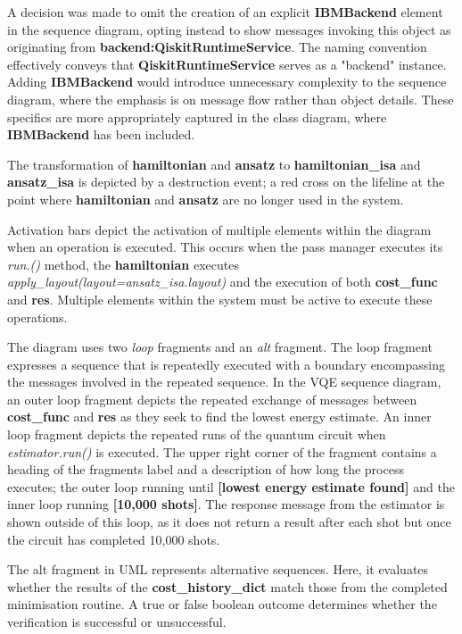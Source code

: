 \documentclass{article}
\begin{document}
A decision was made to omit the creation of an explicit \textbf{IBMBackend} element in the sequence diagram, opting instead to show messages invoking this object as originating from \textbf{backend:QiskitRuntimeService}.
The naming convention effectively conveys that \textbf{QiskitRuntimeService} serves as a "backend" instance. Adding \textbf{IBMBackend} would introduce unnecessary complexity to the sequence diagram, where the emphasis is on message flow rather than object details. These specifics are more appropriately captured in the class diagram, where \textbf{IBMBackend} has been included.

The transformation of \textbf{hamiltonian} and \textbf{ansatz} to \textbf{hamiltonian\_isa} and \textbf{ansatz\_isa} is depicted by a destruction event; a red cross on the lifeline at the point where \textbf{hamiltonian} and \textbf{ansatz} are no longer used in the system.

Activation bars depict the activation of multiple elements within the diagram when an operation is executed\cite{creatley}. This occurs when the pass manager executes its \textit{run.()} method, the  \textbf{hamiltonian} executes \textit{apply\_layout(layout=ansatz\_isa.layout)} and the execution of both \textbf{cost\_func} and \textbf{res}. Multiple elements within the system must be active to execute these operations.

The diagram uses two \textit{loop} fragments and an \textit{alt} fragment. The loop fragment expresses a sequence that is repeatedly executed\cite{Seidl_Scholz_Huemer_Kappel_Duffy_2014} with a boundary encompassing the messages involved in the repeated sequence. In the VQE sequence diagram, an outer loop fragment depicts the repeated exchange of messages between \textbf{cost\_func} and \textbf{res} as they seek to find the lowest energy estimate. An inner loop fragment depicts the repeated runs of the quantum circuit when \textit{estimator.run()} is executed. The upper right corner of the fragment contains a heading of the fragments label and a description of how long the process executes; the outer loop running until \textbf{[lowest energy estimate found]} and the inner loop running \textbf{[10,000 shots]}. The response message from the estimator is shown outside of this loop, as it does not return a result after each shot but once the circuit has completed 10,000 shots. 

The alt fragment in UML represents alternative sequences\cite{Seidl_Scholz_Huemer_Kappel_Duffy_2014}. Here, it evaluates whether the results of the \textbf{cost\_history\_dict} match those from the completed minimisation routine. A true or false boolean outcome determines whether the verification is successful or unsuccessful.
\end{document}
